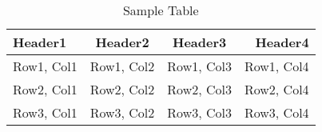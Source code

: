 \begin{table}[htbp]
    \centering
    \caption{Sample Table}\label{tab:example}
    \begin{tabular}{lccr}
      \toprule
      \textbf{Header1} & \textbf{Header2} & \textbf{Header3} & \textbf{Header4} \\
      \midrule
      Row1, Col1 & Row1, Col2 & Row1, Col3 & Row1, Col4 \\
      Row2, Col1 & Row2, Col2 & Row2, Col3 & Row2, Col4 \\
      Row3, Col1 & Row3, Col2 & Row3, Col3 & Row3, Col4 \\
      \bottomrule
    \end{tabular}
\end{table}